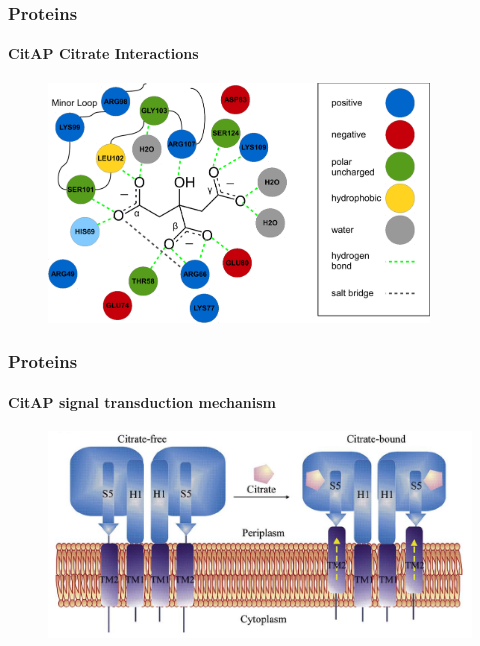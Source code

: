 \documentclass[english]{beamer}
\begin{document}

\begin{frame}
    \frametitle{Proteins}
    \framesubtitle{CitAP Citrate Interactions}

    \begin{figure}
        \includegraphics[width=0.9\textwidth]{figures/citrate_interactions/citrate_interactions.pdf}
    \end{figure}     
\end{frame}      


\begin{frame}
    \frametitle{Proteins}
    \framesubtitle{CitAP signal transduction mechanism}
    \begin{figure}
        \includegraphics[width=.9\linewidth]{figures/CitA_mechanism.png}
    \end{figure}      

    \tiny


\end{frame}  
\end{document}
